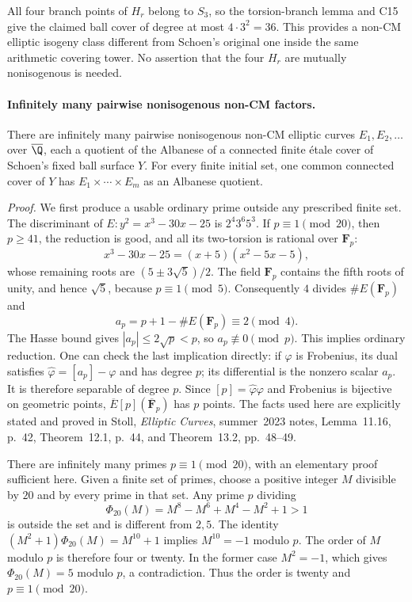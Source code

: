 All four branch points of $H_r$ belong to $S_3$, so the torsion-branch
lemma and C15 give the claimed ball cover of degree at most
$4\cdot3^2=36$.  This provides a non-CM elliptic isogeny class different
from Schoen's original one inside the same arithmetic covering tower.
No assertion that the four $H_r$ are mutually nonisogenous is needed.

\paragraph{Infinitely many pairwise nonisogenous non-CM factors.}
There are infinitely many pairwise nonisogenous non-CM elliptic curves
$E_1,E_2,\ldots$ over $\overline{\Q}$, each a quotient of the Albanese of
a connected finite \'{e}tale cover of Schoen's fixed ball surface $Y$.
For every finite initial set, one common connected cover of $Y$ has
$E_1\times\cdots\times E_m$ as an Albanese quotient.

\emph{Proof.}
We first produce a usable ordinary prime outside any prescribed finite
set.  The discriminant of $E:y^2=x^3-30x-25$ is
$2^4 3^6 5^3$.  If $p\equiv1\pmod{20}$, then $p\geq41$, the reduction
is good, and all its two-torsion is rational over $\mathbf F_p$:
\[
 x^3-30x-25=(x+5)(x^2-5x-5),
\]
whose remaining roots are $(5\pm3\sqrt5)/2$.  The field $\mathbf F_p$
contains the fifth roots of unity, and hence $\sqrt5$, because
$p\equiv1\pmod5$.  Consequently $4$ divides $\#E(\mathbf F_p)$ and
\[
 a_p=p+1-\#E(\mathbf F_p)\equiv2\pmod4.
\]
The Hasse bound gives $|a_p|\leq2\sqrt p<p$, so $a_p\not\equiv0\pmod p$.
This implies ordinary reduction.  One can check the last implication
directly: if $\varphi$ is Frobenius, its dual satisfies
$\widehat\varphi=[a_p]-\varphi$ and has degree $p$; its differential is
the nonzero scalar $a_p$.  It is therefore separable of degree $p$.
Since $[p]=\widehat\varphi\varphi$ and Frobenius is bijective on geometric
points, $\overline E[p](\overline{\mathbf F}_p)$ has $p$ points.
The facts used here are explicitly stated and proved in Stoll,
\emph{Elliptic Curves}, summer~2023 notes, Lemma~11.16, p.~42,
Theorem~12.1, p.~44, and Theorem~13.2, pp.~48--49.

There are infinitely many primes $p\equiv1\pmod{20}$, with an elementary
proof sufficient here.  Given a finite set of primes, choose a positive
integer $M$ divisible by $20$ and by every prime in that set.  Any prime
$p$ dividing
\[
 \Phi_{20}(M)=M^8-M^6+M^4-M^2+1>1
\]
is outside the set and is different from $2,5$.  The identity
$(M^2+1)\Phi_{20}(M)=M^{10}+1$ implies $M^{10}=-1$ modulo $p$.
The order of $M$ modulo $p$ is therefore four or twenty.  In the former
case $M^2=-1$, which gives $\Phi_{20}(M)=5$ modulo $p$, a contradiction.
Thus the order is twenty and $p\equiv1\pmod{20}$.

